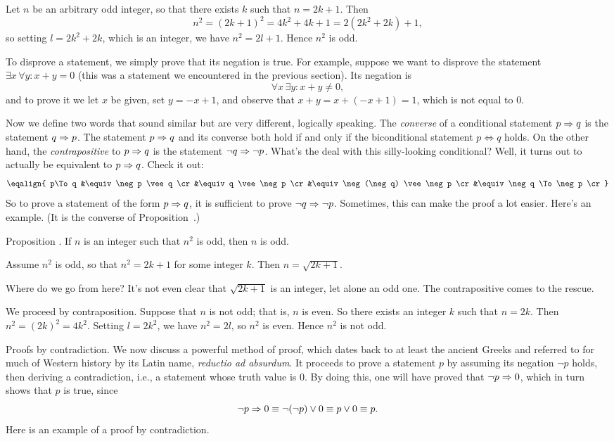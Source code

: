 \proof Let $n$ be an arbitrary odd integer, so that there exists $k$ such that $n = 2k+1$. Then
$$n^2 = (2k+1)^2 = 4k^2 + 4k + 1 = 2(2k^2 + 2k)+1,$$
so setting $l = 2k^2 + 2k$, which is an integer, we have $n^2 = 2l+1$. Hence $n^2$ is odd.\slug

To disprove a statement, we simply prove that its negation is true. For example, suppose we want
to disprove the statement $\exists x\, \forall y : x+y = 0$ (this was a statement we encountered
in the previous section). Its negation is
$$\forall x\, \exists y : x+y \ne 0,$$
and to prove it we let $x$ be given, set $y = -x + 1$, and observe that $x+y = x + (-x+1) = 1$, which is
not equal to $0$.

Now we define two words that sound similar but are very different, logically speaking.
The {\it converse}
of a conditional statement $p\Rightarrow q$ is the statement $q\Rightarrow p$. The
statement $p\Rightarrow q$ and its converse both hold if and only if
the biconditional statement $p\Leftrightarrow q$ holds.
On the other hand, the {\it contrapositive} to $p\Rightarrow q$ is the statement
$\neg q \Rightarrow \neg p$. What's the deal with this silly-looking conditional? Well, it turns out to actually
be equivalent to $p\Rightarrow q$. Check it out:
$$\eqalign{
p\To q &\equiv \neg p \vee q \cr
&\equiv q \vee \neg p \cr
&\equiv \neg (\neg q) \vee \neg p \cr
&\equiv \neg q \To \neg p \cr
}$$
So to prove a statement of the form $p\Rightarrow q$, it is sufficient to prove $\neg q\Rightarrow \neg p$. Sometimes,
this can make the proof a lot easier. Here's an example. (It is the converse of
Proposition~{\propoddimpliessquareodd}.)

\edef\propsquareoddimpliesodd{\the\thmcount}
\proclaim Proposition \advthm. If $n$ is an integer such that $n^2$ is odd, then $n$ is odd.

\enspace Assume $n^2$ is odd, so that $n^2 = 2k+1$ for some integer $k$.
Then $n = \sqrt{2k+1}$.
\medskip

Where do we go from here? It's not even clear that $\sqrt{2k+1}$ is an integer, let alone an odd one.
The contrapositive comes to the rescue.

\medskip\noindent{\it Proof of Proposition~{\propsquareoddimpliesodd}.}\enspace
We proceed by contraposition.
Suppose that $n$ is not odd; that is, $n$ is even. So there
exists an integer $k$ such that $n=2k$. Then $n^2 = (2k)^2 = 4k^2$. Setting $l = 2k^2$, we have
$n^2 = 2l$, so $n^2$ is even. Hence $n^2$ is not odd.\slug

\medskip\boldlabel Proofs by contradiction. We now discuss a powerful method of proof, which dates
back to at least the
ancient Greeks and referred to for much of Western history by its Latin name,
{\it reductio ad absurdum}. It proceeds to prove
a statement $p$ by assuming its negation $\neg p$
holds, then deriving a contradiction, i.e., a statement whose truth value is $0$.
By doing this, one will have proved that $\neg p\Rightarrow 0$, which in turn shows that $p$ is true, since
$$\neg p \Rightarrow 0 \equiv \neg(\neg p) \vee 0 \equiv p\vee 0 \equiv p.$$
Here is an example of a proof by contradiction.


